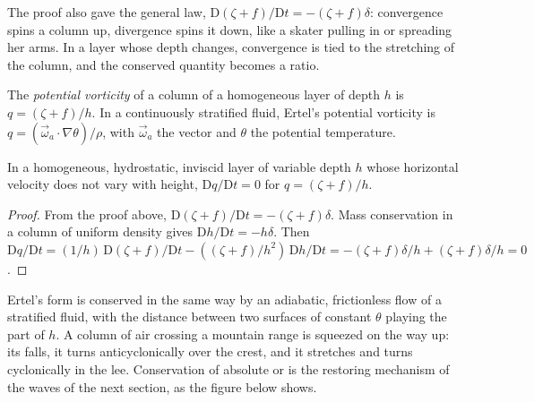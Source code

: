The proof also gave the general law, $\mathrm D(\zeta + f)/\mathrm Dt =
-(\zeta + f)\delta$: convergence spins a column up, divergence spins it
down, like a skater pulling in or spreading her arms. In a layer whose
depth changes, convergence is tied to the stretching of the column, and
the conserved quantity becomes a ratio.

\begin{definition}\label{def:b3:atmospheric-dynamics:pv}
The \emph{potential vorticity} of a column of a
homogeneous layer of depth $h$ is $q = (\zeta + f)/h$. In a continuously
stratified fluid, Ertel's potential vorticity is $q = (\vec\omega_a\cdot
\nabla\theta)/\rho$, with $\vec\omega_a$ the  vector and
$\theta$ the potential temperature.
\end{definition}

\begin{theorem}\label{thm:b3:atmospheric-dynamics:pv}
In a homogeneous, hydrostatic, inviscid layer of variable depth $h$ whose
horizontal velocity does not vary with height, $\mathrm Dq/\mathrm Dt = 0$
for $q = (\zeta + f)/h$.
\end{theorem}

\begin{proof}
From the proof above, $\mathrm D(\zeta + f)/\mathrm Dt = -(\zeta + f)\delta$.
Mass conservation in a column of uniform density gives $\mathrm Dh/\mathrm
Dt = -h\delta$. Then $\mathrm Dq/\mathrm Dt = (1/h)\,\mathrm D(\zeta +
f)/\mathrm Dt - ((\zeta + f)/h^2)\,\mathrm Dh/\mathrm Dt = -(\zeta +
f)\delta/h + (\zeta + f)\delta/h = 0$.
\end{proof}

Ertel's form is conserved in the same way by an adiabatic, frictionless
flow of a stratified fluid, with the distance between two surfaces of
constant $\theta$ playing the part of $h$. A column of air crossing a
mountain range is squeezed on the way up: its  falls, it
turns anticyclonically over the crest, and it stretches and turns
cyclonically in the lee. Conservation of
absolute or  is the restoring mechanism of the waves
of the next section, as the figure below shows.

